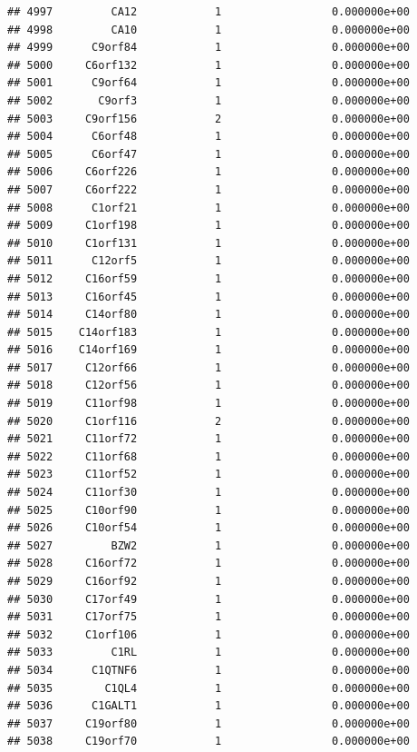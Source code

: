 \documentclass[
]{article}
\begin{document}
\begin{verbatim}
## 4997         CA12            1                 0.000000e+00
## 4998         CA10            1                 0.000000e+00
## 4999      C9orf84            1                 0.000000e+00
## 5000     C6orf132            1                 0.000000e+00
## 5001      C9orf64            1                 0.000000e+00
## 5002       C9orf3            1                 0.000000e+00
## 5003     C9orf156            2                 0.000000e+00
## 5004      C6orf48            1                 0.000000e+00
## 5005      C6orf47            1                 0.000000e+00
## 5006     C6orf226            1                 0.000000e+00
## 5007     C6orf222            1                 0.000000e+00
## 5008      C1orf21            1                 0.000000e+00
## 5009     C1orf198            1                 0.000000e+00
## 5010     C1orf131            1                 0.000000e+00
## 5011      C12orf5            1                 0.000000e+00
## 5012     C16orf59            1                 0.000000e+00
## 5013     C16orf45            1                 0.000000e+00
## 5014     C14orf80            1                 0.000000e+00
## 5015    C14orf183            1                 0.000000e+00
## 5016    C14orf169            1                 0.000000e+00
## 5017     C12orf66            1                 0.000000e+00
## 5018     C12orf56            1                 0.000000e+00
## 5019     C11orf98            1                 0.000000e+00
## 5020     C1orf116            2                 0.000000e+00
## 5021     C11orf72            1                 0.000000e+00
## 5022     C11orf68            1                 0.000000e+00
## 5023     C11orf52            1                 0.000000e+00
## 5024     C11orf30            1                 0.000000e+00
## 5025     C10orf90            1                 0.000000e+00
## 5026     C10orf54            1                 0.000000e+00
## 5027         BZW2            1                 0.000000e+00
## 5028     C16orf72            1                 0.000000e+00
## 5029     C16orf92            1                 0.000000e+00
## 5030     C17orf49            1                 0.000000e+00
## 5031     C17orf75            1                 0.000000e+00
## 5032     C1orf106            1                 0.000000e+00
## 5033         C1RL            1                 0.000000e+00
## 5034      C1QTNF6            1                 0.000000e+00
## 5035        C1QL4            1                 0.000000e+00
## 5036      C1GALT1            1                 0.000000e+00
## 5037     C19orf80            1                 0.000000e+00
## 5038     C19orf70            1                 0.000000e+00

\end{verbatim}
\end{document}
